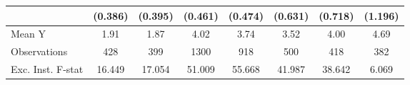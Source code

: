 {\begin{tabular}{l*{7}{c}}
            &     (0.386)         &     (0.395)         &     (0.461)         &     (0.474)         &     (0.631)         &     (0.718)         &     (1.196)         \\
\midrule
Mean Y      &        1.91         &        1.87         &        4.02         &        3.74         &        3.52         &        4.00         &        4.69         \\
Observations&         428         &         399         &        1300         &         918         &         500         &         418         &         382         \\
Exc. Inst. F-stat&      16.449         &      17.054         &      51.009         &      55.668         &      41.987         &      38.642         &       6.069         \\
\bottomrule
\end{tabular}
}
